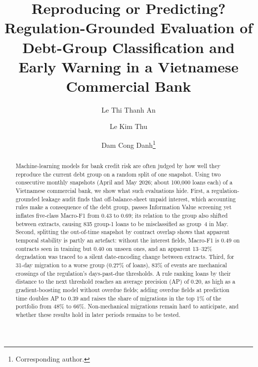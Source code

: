 \documentclass[runningheads]{llncs}
\begin{document}
\setlength{\emergencystretch}{1.5em}

\title{Reproducing or Predicting? Regulation-Grounded Evaluation of Debt-Group Classification and Early Warning in a Vietnamese Commercial Bank}

\author{Le Thi Thanh An \and
Le Kim Thu \and
Dam Cong Danh\thanks{Corresponding author.}}

\maketitle

\begin{abstract}
Machine-learning models for bank credit risk are often judged by how well they reproduce the current debt group on a random split of one snapshot. Using two consecutive monthly snapshots (April and May 2026; about 100,000 loans each) of a Vietnamese commercial bank, we show what such evaluations hide. First, a regulation-grounded leakage audit finds that off-balance-sheet unpaid interest, which accounting rules make a consequence of the debt group, passes Information Value screening yet inflates five-class Macro-F1 from 0.43 to 0.69; its relation to the group also shifted between extracts, causing 835 group-1 loans to be misclassified as group~4 in May. Second, splitting the out-of-time snapshot by contract overlap shows that apparent temporal stability is partly an artefact: without the interest fields, Macro-F1 is 0.49 on contracts seen in training but 0.40 on unseen ones, and an apparent 13--32\% degradation was traced to a silent date-encoding change between extracts. Third, for 31-day migration to a worse group (0.27\% of loans), 83\% of events are mechanical crossings of the regulation's days-past-due thresholds. A rule ranking loans by their distance to the next threshold reaches an average precision (AP) of 0.20, as high as a gradient-boosting model without overdue fields; adding overdue fields at prediction time doubles AP to 0.39 and raises the share of migrations in the top 1\% of the portfolio from 48\% to 66\%. Non-mechanical migrations remain hard to anticipate, and whether these results hold in later periods remains to be tested.

\end{abstract}
\end{document}
